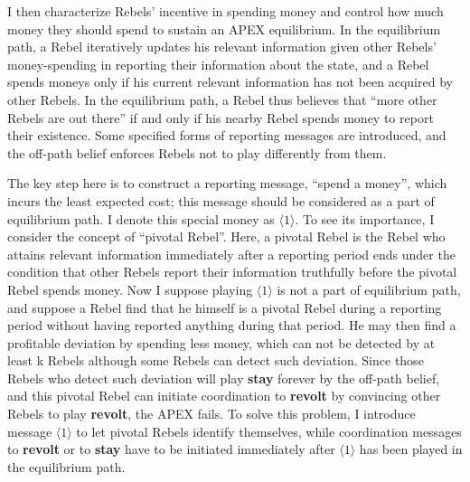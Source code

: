 \documentclass[12pt,letterpaper]{article}
\theoremstyle{definition}
\theoremstyle{remark}
\theoremstyle{claim}
\begin{document}
I then characterize Rebels' incentive in spending money and control how much money they should spend to sustain an APEX equilibrium. In the equilibrium path, a Rebel iteratively updates his relevant information given other Rebels' money-spending in reporting their information about the state, and a Rebel spends moneys only if his current relevant information has not been acquired by other Rebels. In the equilibrium path, a Rebel thus believes that ``more other Rebels are out there'' if and only if his nearby Rebel spends money to report their existence. Some specified forms of reporting messages are introduced, and the off-path belief enforces Rebels not to play differently from them.

The key step here is to construct a reporting message, ``spend a money'', which incurs the least expected cost; this message should be considered as a part of equilibrium path. I denote this special money as $\langle 1 \rangle$. To see its importance, I consider the concept of ``pivotal Rebel''. Here, a pivotal Rebel is the Rebel who attains relevant information immediately after a reporting period ends under the condition that other Rebels report their information truthfully before the pivotal Rebel spends money. Now I suppose playing $\langle 1 \rangle$ is not a part of equilibrium path, and suppose a Rebel find that he himself is a pivotal Rebel during a reporting period without having reported anything during that period. He may then find a profitable deviation by spending less money, which can not be detected by at least k Rebels although some Rebels can detect such deviation. Since those Rebels who detect such deviation will play \textbf{stay} forever by the off-path belief, and this pivotal Rebel can initiate coordination to \textbf{revolt} by convincing other Rebels to play \textbf{revolt}, the APEX fails. To solve this problem, I introduce message $\langle 1 \rangle$ to let pivotal Rebels identify themselves, while coordination messages to \textbf{revolt} or to \textbf{stay} have to be initiated immediately after $\langle 1 \rangle$ has been played in the equilibrium path.
\end{document}
